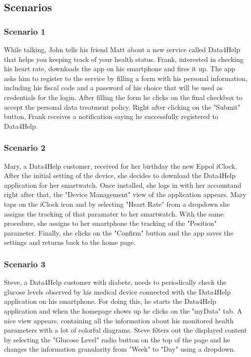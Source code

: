 \subsection{Scenarios}
\subsubsection{Scenario 1}
While talking, John tells his friend Matt about a new service called Data4Help that helps you keeping track of your health status. Frank, interested in checking his heart rate, downloads the app on his smartphone and fires it up. The app asks him to register to the service by filling a form with his personal information, including his fiscal code and a password of his choice that will be used as credentials for the login. 
After filling the form he clicks on the final checkbox to accept the personal data treatment policy.
Right after clicking on the "Submit" button, Frank receives a notification saying he successfully registered to Data4Help.
\subsubsection{Scenario 2}
Mary, a Data4Help customer, received for her birthday the new Eppol iClock. After the initial setting of the device, she decides to download the Data4Help application for her smartwatch. Once installed, she logs in with her accountand right after that, the "Device Management"
 view of the application appears. Mary taps on the iClock icon and by selecting "Heart Rate" from a dropdown she assigns the tracking of that paramater to her smartwatch. With the same procedure, she assigns to her smartphone the tracking of the "Position" parameter.
Finally, she clicks on the "Confirm" button and the app saves the settings and returns back to the home page.
\subsubsection{Scenario 3}
Steve, a Data4Help customer with diabete, needs to periodically check the glucose levels observed by his medical device connected with the Data4Help application on his smartphone. For doing this, he starts the Data4Help application and when the homepage shows up he  clicks on the "myData" tab. A nice view appears, containing all the information about his monitored health parameters with a lot of colorful diagrams. Steve filters out the displayed content by selecting the "Glucose Level" radio button on the top of the page and he changes the information granularity from "Week" to "Day" using a dropdown.  
